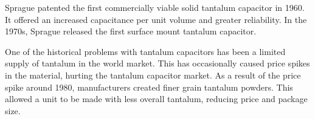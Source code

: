 \noindent Sprague patented the first commercially viable solid tantalum capacitor in 1960. It offered an increased capacitance per unit volume and greater reliability.\cite{charTant} In the 1970s, Sprague released the first surface mount tantalum capacitor.\cite{spragueHist}

\noindent One of the historical problems with tantalum capacitors has been a limited supply of tantalum in the world market. This has occasionally caused price spikes in the material, hurting the tantalum capacitor market. As a result of the price spike around 1980, manufacturers created finer grain tantalum powders. This allowed a unit to be made with less overall tantalum, reducing price and package size.\cite[ch~3.1]{tantMis}

